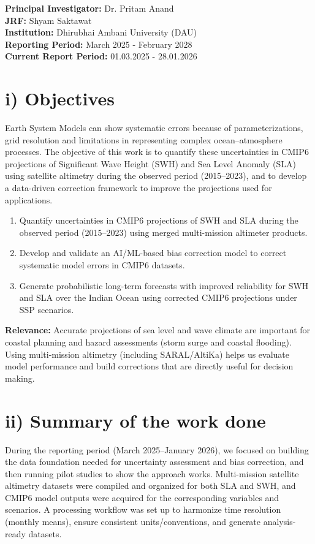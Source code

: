 \documentclass[11pt,a4paper]{article}
\begin{document}
\vspace{1em}
\noindent \textbf{Principal Investigator:} Dr. Pritam Anand \\
\textbf{JRF:} Shyam Saktawat \\
\textbf{Institution:} Dhirubhai Ambani University (DAU) \\
\textbf{Reporting Period:} March 2025 - February 2028 \\
\textbf{Current Report Period:} 01.03.2025 - 28.01.2026

\section*{i) Objectives}
Earth System Models can show systematic errors because of parameterizations, grid resolution and limitations in representing complex ocean–atmosphere processes. The objective of this work is to quantify these uncertainties in CMIP6 projections of Significant Wave Height (SWH) and Sea Level Anomaly (SLA) using satellite altimetry during the observed period (2015--2023), and to develop a data-driven correction framework to improve the projections used for applications.

\begin{enumerate}[label=\alph*)]
    \item Quantify uncertainties in CMIP6 projections of SWH and SLA during the observed period (2015--2023) using merged multi-mission altimeter products.
    \item Develop and validate an AI/ML-based bias correction model to correct systematic model errors in CMIP6 datasets.
    \item Generate probabilistic long-term forecasts with improved reliability for SWH and SLA over the Indian Ocean using corrected CMIP6 projections under SSP scenarios.
\end{enumerate}

\noindent\textbf{Relevance:} Accurate projections of sea level and wave climate are important for coastal planning and hazard assessments (storm surge and coastal flooding). Using multi-mission altimetry (including SARAL/AltiKa) helps us evaluate model performance and build corrections that are directly useful for decision making.

\section*{ii) Summary of the work done}
During the reporting period (March 2025--January 2026), we focused on building the data foundation needed for uncertainty assessment and bias correction, and then running pilot studies to show the approach works. Multi-mission satellite altimetry datasets were compiled and organized for both SLA and SWH, and CMIP6 model outputs were acquired for the corresponding variables and scenarios. A processing workflow was set up to harmonize time resolution (monthly means), ensure consistent units/conventions, and generate analysis-ready datasets.
\end{document}
